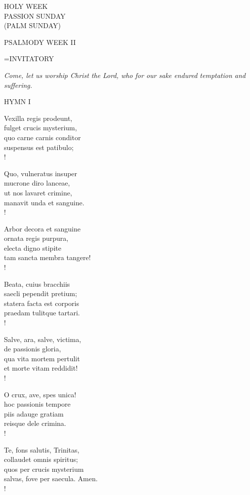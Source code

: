 \begin{center}\normalsize HOLY WEEK\\
\footnotesize PASSION SUNDAY\\
\footnotesize (PALM SUNDAY)\\
\end{center}

PSALMODY WEEK II

\hangindent=\parindent \small{INVITATORY}
\begin{center}
\textit{Come, let us worship Christ the Lord, who for our sake endured temptation and suffering.\\}
\end{center}

\noindent\small{\uppercase{Hymn I }}\normalsize\label{holyweek:firstHymn}
\begin{cverse}
Vexilla regis prodeunt,\\
fulget crucis mysterium,\\
quo carne carnis conditor\\
suspensus est patibulo;\\!

Quo, vulneratus insuper \\
mucrone diro lanceae,\\
ut nos lavaret crimine,\\
manavit unda et sanguine.\\!

Arbor decora et sanguine\\
ornata regis purpura,\\
electa digno stipite\\
tam sancta membra tangere!\\!

Beata, cuius bracchiis\\
saecli pependit pretium;\\
statera facta est corporis\\
praedam tulitque tartari.\\!

Salve, ara, salve, victima,\\
de passionis gloria,\\
qua vita mortem pertulit\\
et morte vitam reddidit!\\!

O crux, ave, spes unica!\\
hoc passionis tempore\\
piis adauge gratiam\\
reisque dele crimina.\\!

Te, fons salutis, Trinitas,\\
collaudet omnis spiritus;\\
quos per crucis mysterium\\
salvas, fove per saecula. Amen.\\!
\end{cverse}


